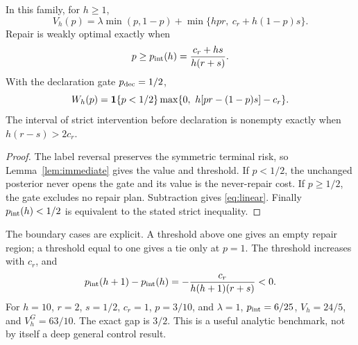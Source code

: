 \begin{proposition}
\label{prop:noinfo}
In this family, for $h\ge1$,
\begin{equation}
V_h(p)=\lambda\min(p,1-p)+
\min\{hpr,\ c_r+h(1-p)s\}.
\end{equation}
Repair is weakly optimal exactly when
\begin{equation}
p\ge p_{\mathrm{int}}(h)=\frac{c_r+hs}{h(r+s)}.
\label{eq:threshold}
\end{equation}
With the declaration gate $p_{\mathrm{dec}}=1/2$,
\begin{equation}
W_h(p)=\mathbf 1\{p<1/2\}
\max\{0,\ h[pr-(1-p)s]-c_r\}.
\label{eq:linear}
\end{equation}
The interval of strict intervention before declaration is nonempty exactly when
$h(r-s)>2c_r$.
\end{proposition}
\begin{proof}
The label reversal preserves the symmetric terminal risk, so
Lemma~\ref{lem:immediate} gives the value and threshold. If $p<1/2$, the unchanged
posterior never opens the gate and its value is the never-repair cost. If
$p\ge1/2$, the gate excludes no repair plan. Subtraction gives \eqref{eq:linear}.
Finally $p_{\mathrm{int}}(h)<1/2$ is equivalent to the stated strict inequality.
\end{proof}

The boundary cases are explicit. A threshold above one gives an empty repair
region; a threshold equal to one gives a tie only at $p=1$.
The threshold increases with $c_r$, and
\begin{equation}
p_{\mathrm{int}}(h+1)-p_{\mathrm{int}}(h)
=-\frac{c_r}{h(h+1)(r+s)}<0.
\end{equation}
For $h=10$, $r=2$, $s=1/2$, $c_r=1$, $p=3/10$, and $\lambda=1$,
$p_{\mathrm{int}}=6/25$, $V_h=24/5$, and $V_h^G=63/10$. The exact gap is $3/2$.
This is a useful analytic benchmark, not by itself a deep general control result.
